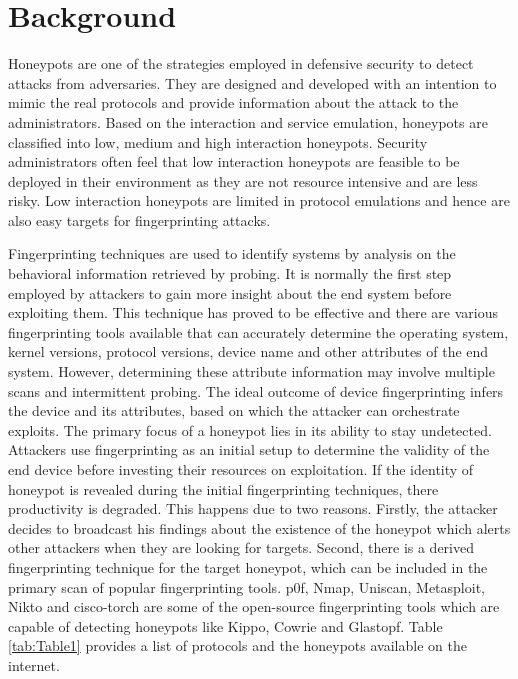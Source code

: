 \documentclass[letterpaper, 10 pt, conference]{ieeeconf}  %
\begin{document}
\section{Background}
Honeypots are one of the strategies employed in defensive security to detect attacks from adversaries. They are designed and developed with an intention to mimic the real protocols and provide information about the attack to the administrators. Based on the interaction and service emulation, honeypots are classified into low, medium and high interaction honeypots. Security administrators often feel that low interaction honeypots are feasible to be deployed in their environment as they are not resource intensive and are less risky. Low interaction honeypots are limited in protocol emulations and hence are also easy targets for fingerprinting attacks. 

Fingerprinting techniques are used to identify systems by analysis on the behavioral information retrieved by probing. It is normally the first step employed by attackers to gain more insight about the end system before exploiting them. This technique has proved to be effective and there are various fingerprinting tools available that can accurately determine the operating system, kernel versions, protocol versions, device name and other attributes of the end system. However, determining these attribute information may involve multiple scans and intermittent probing. The ideal outcome of device fingerprinting infers the device and its attributes, based on which the attacker can orchestrate exploits. The primary focus of a honeypot lies in its ability to stay undetected. Attackers use fingerprinting as an initial setup to determine the validity of the end device before investing their resources on exploitation. If the identity of honeypot is revealed during the initial fingerprinting techniques, there productivity is degraded. This happens due to two reasons. Firstly, the attacker decides to broadcast his findings about the existence of the honeypot which alerts other attackers when they are looking for targets. Second, there is a derived fingerprinting technique for the target honeypot, which can be included in the primary scan of popular fingerprinting tools. p0f, Nmap, Uniscan, Metasploit, Nikto and cisco-torch are some of the open-source fingerprinting tools which are capable of detecting honeypots like Kippo, Cowrie and Glastopf. Table \ref{tab:Table1} provides a list of protocols and the honeypots available on the internet.   
\end{document}
